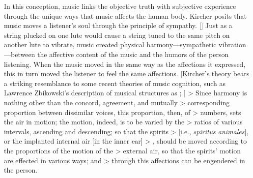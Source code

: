 In this conception, music links the objective truth with subjective experience through the unique ways that music affects the human body.
Kircher posits that music moves a listener's soul through the principle of sympathy.
[\Autocites[On the links between this interest in the occult powers of music and
early scientific research, see][]{Gouk:Sciences}{Gouk:Harmonics}]
Just as a string plucked on one lute would cause a string tuned to the same pitch on another lute to vibrate, music created physical harmony---sympathetic vibration---between the affective content of the music and the humors of the person listening.
When the music moved in the same way as the affections it expressed, this in turn moved the listener to feel the same affections.
[Kircher's theory bears a striking resemblance to some recent theories of music
cognition, such as Lawrence Zbikowski's description of musical structures as
;
\autocite[XXX]{Zbikowski:DanceTopoi}]
> Since harmony is nothing other than the concord, agreement, and mutually > corresponding proportion between dissimilar voices, this proportion, then, of > numbers, sets the air in motion; the motion, indeed, is to be varied by the > ratios of various intervals, ascending and descending; so that the spirits  > [i.e., \emph{spiritus animales}], or the implanted internal air [in the inner ear] > \Dots{}, should be moved according to the proportions of the motion of the > external air, so that the spirits' motion are effected in various ways; and > through this affections can be engendered in the person.
\Autocite[552: .]{Kircher:Musurgia}

